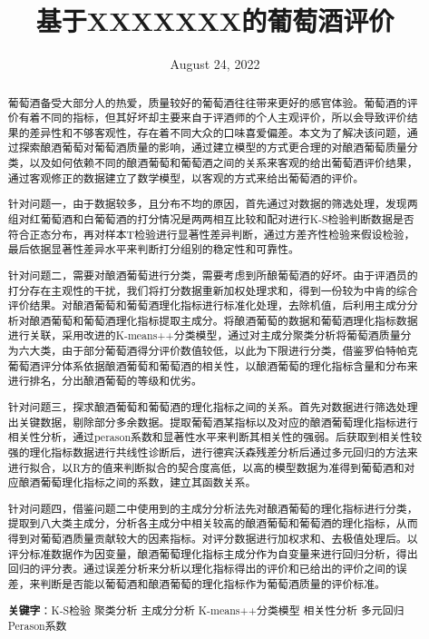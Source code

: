 \documentclass[UTF8]{ctexart}
\title{基于\textbf{XXXXX}XX的葡萄酒评价}
\date{August 24, 2022}
\begin{document}
\maketitle{}
\renewcommand{\abstractname}{\Large 摘要\\}
\begin{abstract}
	\normalsize
	葡萄酒备受大部分人的热爱，质量较好的葡萄酒往往带来更好的感官体验。葡萄酒的评价有着不同的指标，但其好坏却主要来自于评酒师的个人主观评价，所以会导致评价结果的差异性和不够客观性，存在着不同大众的口味喜爱偏差。本文为了解决该问题，通过探索酿酒葡萄对葡萄酒质量的影响，通过建立模型的方式更合理的对酿酒葡萄质量分类，以及如何依赖不同的酿酒葡萄和葡萄酒之间的关系来客观的给出葡萄酒评价结果，通过客观修正的数据建立了数学模型，以客观的方式来给出葡萄酒的评价。

	针对问题一，由于数据较多，且分布不均的原因，首先通过对数据的筛选处理，发现两组对红葡萄酒和白葡萄酒的打分情况是两两相互比较和配对进行K-S检验判断数据是否符合正态分布，再对样本T检验进行显著性差异判断，通过方差齐性检验来假设检验，最后依据显著性差异水平来判断打分组别的稳定性和可靠性。

	针对问题二，需要对酿酒葡萄进行分类，需要考虑到所酿葡萄酒的好坏。由于评酒员的打分存在主观性的干扰，我们将打分数据重新加权处理求和，得到一份较为中肯的综合评价结果。对酿酒葡萄和葡萄酒理化指标进行标准化处理，去除机值，后利用主成分分析对酿酒葡萄和葡萄酒理化指标提取主成分。将酿酒葡萄的数据和葡萄酒理化指标数据进行关联，采用改进的K-means++分类模型，通过对主成分聚类分析将葡萄酒质量分为六大类，由于部分葡萄酒得分评价数值较低，以此为下限进行分类，借鉴罗伯特帕克葡萄酒评分体系依据酿酒葡萄和葡萄酒的相关性，以酿酒葡萄的理化指标含量和分布来进行排名，分出酿酒葡萄的等级和优劣。

	针对问题三，探求酿酒葡萄和葡萄酒的理化指标之间的关系。首先对数据进行筛选处理出关键数据，剔除部分多余数据。提取葡萄酒某指标以及对应的酿酒葡萄理化指标进行相关性分析，通过perason系数和显著性水平来判断其相关性的强弱。后获取到相关性较强的理化指标数据进行共线性诊断后，进行德宾沃森残差分析后通过多元回归的方法来进行拟合，以R方的值来判断拟合的契合度高低，以高的模型数据为准得到葡萄酒和对应酿酒葡萄理化指标之间的系数，建立其函数关系。

	针对问题四，借鉴问题二中使用到的主成分分析法先对酿酒葡萄的理化指标进行分类，提取到八大类主成分，分析各主成分中相关较高的酿酒葡萄和葡萄酒的理化指标，从而得到对葡萄酒质量贡献较大的因素指标。对评分数据进行加权求和、去极值处理后。以评分标准数据作为因变量，酿酒葡萄理化指标主成分作为自变量来进行回归分析，得出回归的评分表。通过误差分析来分析以理化指标得出的评价和已给出的评价之间的误差，来判断是否能以葡萄酒和酿酒葡萄的理化指标作为葡萄酒质量的评价标准。

	\textbf{关键字}：K-S检验  聚类分析  主成分分析 K-means++分类模型 相关性分析 多元回归	Perason系数

\end{abstract}
\end{document}

